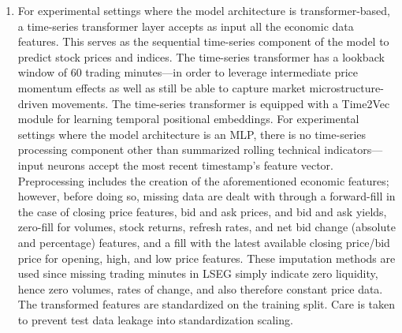 \documentclass[stu,floatsintext]{apa7}
\begin{document}
\begin{enumerate}
\item For experimental settings where the model architecture is transformer-based, a time-series transformer layer accepts as input all the economic data features. This serves as the sequential time-series component of the model to predict stock prices and indices. The time-series transformer has a lookback window of 60 trading minutes—in order to leverage intermediate price momentum effects as well as still be able to capture market microstructure-driven movements. The time-series transformer is equipped with a Time2Vec module for learning temporal positional embeddings. For experimental settings where the model architecture is an MLP, there is no time-series processing component other than summarized rolling technical indicators—input neurons accept the most recent timestamp's feature vector. Preprocessing includes the creation of the aforementioned economic features; however, before doing so, missing data are dealt with through a forward-fill in the case of closing price features, bid and ask prices, and bid and ask yields, zero-fill for volumes, stock returns, refresh rates, and net bid change (absolute and percentage) features, and a fill with the latest available closing price/bid price for opening, high, and low price features. These imputation methods are used since missing trading minutes in LSEG simply indicate zero liquidity, hence zero volumes, rates of change, and also therefore constant price data. The transformed features are standardized on the training split. Care is taken to prevent test data leakage into standardization scaling.

\end{enumerate}
\end{document}
